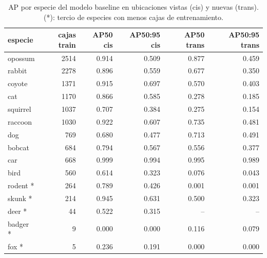 \begin{table}[!htbp]
\centering
\small
\caption{AP por especie del modelo baseline en ubicaciones vistas (cis) y nuevas (trans). (*): tercio de especies con menos cajas de entrenamiento.}
\label{tab:perspecies}
\begin{tabular}{lrrrrr}
\toprule
especie & cajas train & AP50 cis & AP50:95 cis & AP50 trans & AP50:95 trans \\
\midrule
opossum & 2514 & 0.914 & 0.509 & 0.877 & 0.459 \\
rabbit & 2278 & 0.896 & 0.559 & 0.677 & 0.350 \\
coyote & 1371 & 0.915 & 0.697 & 0.570 & 0.403 \\
cat & 1170 & 0.866 & 0.585 & 0.278 & 0.185 \\
squirrel & 1037 & 0.707 & 0.384 & 0.275 & 0.154 \\
raccoon & 1030 & 0.922 & 0.607 & 0.735 & 0.481 \\
dog & 769 & 0.680 & 0.477 & 0.713 & 0.491 \\
bobcat & 684 & 0.794 & 0.567 & 0.556 & 0.377 \\
car & 668 & 0.999 & 0.994 & 0.995 & 0.989 \\
bird & 560 & 0.614 & 0.323 & 0.076 & 0.043 \\
rodent * & 264 & 0.789 & 0.426 & 0.001 & 0.001 \\
skunk * & 214 & 0.945 & 0.631 & 0.500 & 0.323 \\
deer * & 44 & 0.522 & 0.315 & -- & -- \\
badger * & 9 & 0.000 & 0.000 & 0.116 & 0.079 \\
fox * & 5 & 0.236 & 0.191 & 0.000 & 0.000 \\
\bottomrule
\end{tabular}
\end{table}
